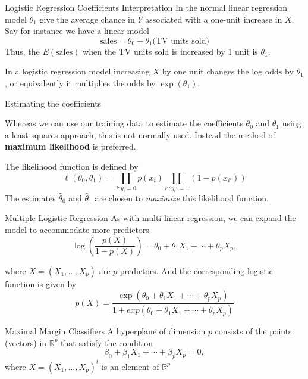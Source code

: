 \documentclass{beamer}
\begin{document}
\begin{frame}{Logistic Regression Coefficients Interpretation}
	In the normal linear regression model $\theta_1$ give the average chance in $Y$ associated with a one-unit increase in $X$.  Say for instance we have a linear model
	\begin{equation*}
		{\textrm{sales}} = {\theta}_0+ {\theta}_1 \textrm{(TV units sold)}
	\end{equation*}
	Thus, the $E(\textrm{sales})$ when the TV units sold is increased by 1 unit is ${\theta}_1$.
	
	In a logistic regression model increasing $X$ by one unit changes the log odds by $\theta_1$, or equivalently it multiplies the odds by $\exp(\theta_1)$. 
	
\end{frame}

\begin{frame}{Estimating the coefficients}
	
	Whereas we can use our training data to estimate the coefficients $\theta_0$ and $\theta_1$ using a least squares approach, this is not normally used. Instead the method of {\bf maximum likelihood} is preferred. 
	
	The likelihood function is defined by 
	\begin{equation*}
		\ell (\theta_0,\theta_1)= \prod_{i:y_i=0} p(x_i) \prod_{i':y_i'=1} (1-p(x_{i'}))
	\end{equation*}
The estimates $\hat{\theta}_0$ and $\hat{\theta}_1$  are chosen to {\it maximize} this likelihood function. 
	
\end{frame}

\begin{frame}{Multiple Logistic Regression}
	As with multi linear regression, we can expand the model to accommodate more predictors
	\begin{equation*}
		\log \left( \frac{p(X)}{1-p(X)} \right) = \theta_0 + \theta_1 X_1 + \cdots+ \theta_p X_p,
	\end{equation*} 
	
	where $X=(X_1,\ldots,X_p)$ are $p$ predictors. And the corresponding logistic function is given by
	\begin{equation*}
		p(X)= \frac{\exp(\theta_0 + \theta_1 X_1 + \cdots+ \theta_p X_p)}{1 +exp(\theta_0 + \theta_1 X_1 + \cdots+ \theta_p X_p) }
	\end{equation*}
\end{frame}

\begin{frame}{Maximal Margin Classifiers}
	A hyperplane of dimension $p$ consists of the points (vectors) in $
\mathbb{R}^p$ that satisfy the condition
\begin{equation}
	\beta_0 + \beta_1 X_1 + \cdots + \beta_p X_p=0,
	\label{eq:hyper}
\end{equation}
where $X= (X_1,\ldots, X_p)^t $ is an element of $\mathbb{R}^p$


	
\end{frame}
\end{document}
